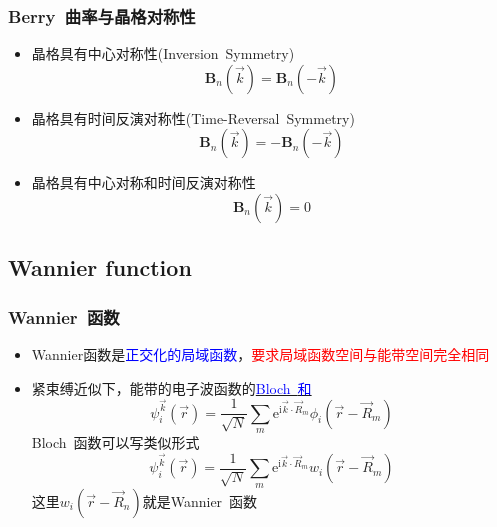 \frame
{
	\frametitle{\textrm{Berry~}曲率与晶格对称性}
	\begin{itemize}
		\item 晶格具有中心对称性\textrm{(Inversion~Symmetry)}
			\begin{displaymath}
				\mathbf{B}_n(\vec k)=\mathbf{B}_n(-\vec k)
			\end{displaymath}
		\item 晶格具有时间反演对称性\textrm{(Time-Reversal~Symmetry)}
			\begin{displaymath}
				\mathbf{B}_n(\vec k)=-\mathbf{B}_n(-\vec k)
			\end{displaymath}
		\item 晶格具有中心对称和时间反演对称性
			\begin{displaymath}
				\mathbf{B}_n(\vec k)=0
			\end{displaymath}
	\end{itemize}
}

\subsection{\rm{Wannier function}}
\frame
{
	\frametitle{\textrm{Wannier~}函数}
	\begin{itemize}
		\item \textrm{Wannier}函数是\textcolor{blue}{正交化的局域函数}，\textcolor{red}{要求局域函数空间与能带空间完全相同}
		\item 紧束缚近似下，能带的电子波函数的\underline{\textcolor{blue}{\textrm{Bloch~}和}}
			\begin{displaymath}
				\psi_i^{\vec k}(\vec r)=\frac1{\sqrt N}\sum_m\mathrm{e}^{\mathrm{i}\vec k\cdot\vec R_m}\phi_i(\vec r-\vec R_m)
			\end{displaymath}
		\textrm{Bloch~}函数可以写类似形式
		\begin{displaymath}
			\psi_i^{\vec k}(\vec r)=\frac1{\sqrt N}\sum_m\mathrm{e}^{\mathrm{i}\vec k\cdot\vec R_m}w_i(\vec r-\vec R_m) 
		\end{displaymath}
		这里$w_i(\vec r-\vec R_n)$就是\textrm{Wannier~}函数
	\end{itemize}
}

